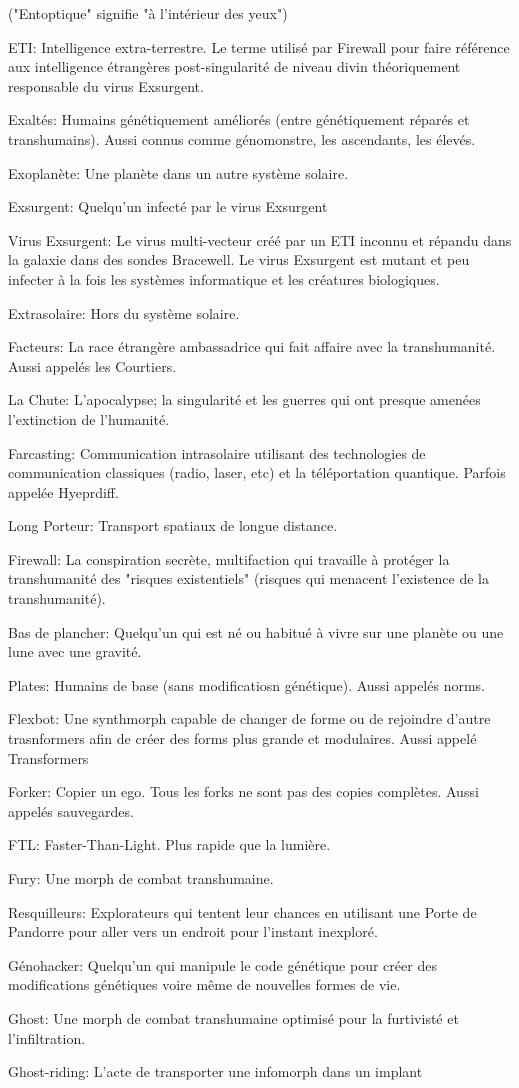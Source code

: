 ("Entoptique" signifie "à l'intérieur des yeux") \item ETI: Intelligence extra-terrestre. Le terme utilisé par Firewall pour faire référence aux intelligence étrangères post-singularité de niveau divin théoriquement responsable du virus Exsurgent. \item Exaltés: Humains génétiquement améliorés (entre génétiquement réparés et transhumains). Aussi connus comme génomonstre, les ascendants, les élevés. \item Exoplanète: Une planète dans un autre système solaire. \item Exsurgent: Quelqu'un infecté par le virus Exsurgent \item Virus Exsurgent: Le virus multi-vecteur créé par un ETI inconnu et répandu dans la galaxie dans des sondes Bracewell. Le virus Exsurgent est mutant et peu infecter à la fois les systèmes informatique et les créatures biologiques. \item Extrasolaire: Hors du système solaire. \item Facteurs: La race étrangère ambassadrice qui fait affaire avec la transhumanité. Aussi appelés les Courtiers. \item La Chute: L'apocalypse; la singularité et les guerres qui ont presque amenées l'extinction de l'humanité. \item Farcasting: Communication intrasolaire utilisant des technologies de communication classiques (radio, laser, etc) et la téléportation quantique. Parfois appelée Hyeprdiff. \item Long Porteur: Transport spatiaux de longue distance. \item Firewall: La conspiration secrète, multifaction qui travaille à protéger la transhumanité des "risques existentiels" (risques qui menacent l'existence de la transhumanité). \item Bas de plancher: Quelqu'un qui est né ou habitué à vivre sur une planète ou une lune avec une gravité. \item Plates: Humains de base (sans modificatiosn génétique). Aussi appelés norms. \item Flexbot: Une synthmorph capable de changer de forme ou de rejoindre d'autre trasnformers afin de créer des forms plus grande et modulaires. Aussi appelé Transformers \item Forker: Copier un ego. Tous les forks ne sont pas des copies complètes. Aussi appelés sauvegardes. \item FTL: Faster-Than-Light. Plus rapide que la lumière. \item Fury: Une morph de combat transhumaine. \item Resquilleurs: Explorateurs qui tentent leur chances en utilisant une Porte de Pandorre pour aller vers un endroit pour l'instant inexploré. \item Génohacker: Quelqu'un qui manipule le code génétique pour créer des modifications génétiques voire même de nouvelles formes de vie. \item Ghost: Une morph de combat transhumaine optimisé pour la furtivisté et  l'infiltration. \item Ghost-riding: L'acte de transporter une infomorph dans un implant 